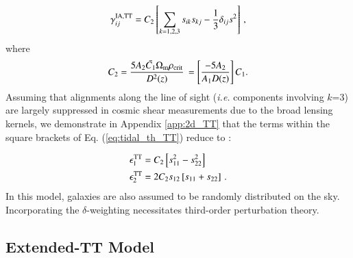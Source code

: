 \begin{eqnarray}
\gamma_{ij}^{\rm IA, TT} = C_2 \left[ \sum_{k=1,2,3} s_{ik} s_{kj} -\frac{1}{3} \delta_{ij} s^2 \right] \, ,
\label{eq:tidal_th_TT}
\end{eqnarray}
where 
\begin{eqnarray}
C_2 = \frac{5 A_2 \bar{C_1} \Omega_{\rm m} \rho_{\rm crit}}{D^2(z)} \,  = \left[ \frac{-5 A_2}{A_1 D(z)} \right] C_1.
\end{eqnarray}
Assuming that alignments along the line of sight ({\it i.e.} components involving $k$=3) are largely suppressed in cosmic shear measurements due to the broad lensing kernels, we demonstrate in Appendix \ref{app:2d_TT} that the terms within the square brackets of Eq. (\ref{eq:tidal_th_TT}) reduce to :

\begin{equation}
\begin{split}
\epsilon_1^{\rm TT} &= C_2  \left[ s_{11}^2 - s_{22}^2\right] \\
 \epsilon_2^{\rm TT} &= 2 C_2 s_{12}\left[s_{11}+s_{22}  \right]\, .
\end{split}
\label{eq:eps_TT}
\end{equation}
In this model, galaxies are also assumed to be randomly distributed on the sky. 
Incorporating the $\delta$-weighting necessitates third-order perturbation theory.



\subsection{Extended-TT Model}
\label{subsec:IA_th_extTT}



